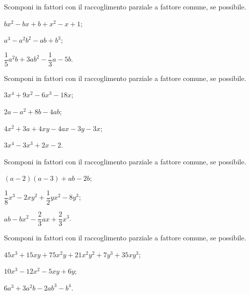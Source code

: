 \begin{esercizio}[\Ast]
\label{ese:15.26}
Scomponi in fattori con il raccoglimento parziale a fattore comune, se possibile.
\begin{multicols}{2}
\begin{enumeratea}
 \item $bx^{2}-bx+b+x^{2}-x+1$;
 \item $a^{3}-a^{2}b^{2}-ab+b^{3}$;
 \item $\dfrac{1}{5}a^{2}b+3ab^{2}-\dfrac{1}{3}a-5b$.
\end{enumeratea}
\end{multicols}
\end{esercizio}

\begin{esercizio}
\label{ese:15.27}
Scomponi in fattori con il raccoglimento parziale a fattore comune, se possibile.
\begin{multicols}{2}
\begin{enumeratea}
 \item $3x^{4}+9x^{2}-6x^{3}-18x$;
 \item $2a-a^{2}+8b-4ab$;
 \item $4x^{2}+3a+4xy-4ax-3y-3x$;
 \item $3x^{4}-3x^{3}+2x-2$.
\end{enumeratea}
\end{multicols}
\end{esercizio}

\begin{esercizio}[\Ast]
\label{ese:15.28}
Scomponi in fattori con il raccoglimento parziale a fattore comune, se possibile.
\begin{multicols}{2}
 \begin{enumeratea}
 \item $(a-2)(a-3)+ab-2b$;
 \item $\dfrac{1}{8}x^{3}-2xy^{2}+\dfrac{1}{2}yx^{2}-8y^{3}$;
 \item $ab-bx^{2}-\dfrac{2}{3}ax+\dfrac{2}{3}x^{3}$.
\end{enumeratea}
\end{multicols}
\end{esercizio}

\begin{esercizio}[\Ast]
\label{ese:15.29}
Scomponi in fattori con il raccoglimento parziale a fattore comune, se possibile.
\begin{enumeratea}
 \item $45x^{3}+15xy+75x^{2}y+21x^{2}y^{2}+7y^{3}+35xy^{3}$;
 \item $10x^3-12x^2-5xy+6y$;
 \item $6a^3+3a^2b-2ab^3-b^4$.
\end{enumeratea}
\end{esercizio}

